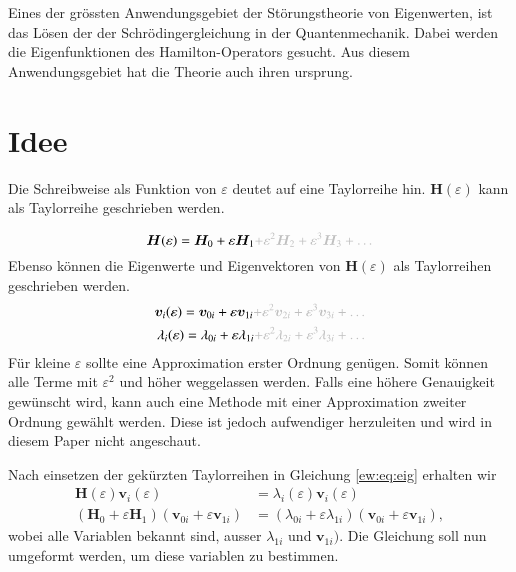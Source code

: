 Eines der grössten Anwendungsgebiet der Störungstheorie von Eigenwerten, ist das Lösen der der Schrödingergleichung in der Quantenmechanik.
Dabei werden die Eigenfunktionen des Hamilton-Operators gesucht.
Aus diesem Anwendungsgebiet hat die Theorie auch ihren ursprung. %

\section{Idee}

Die Schreibweise als Funktion von $\varepsilon$ deutet auf eine Taylorreihe hin. 
$\bm H(\varepsilon)$ kann als Taylorreihe geschrieben werden.

\begin{equation*}
    \bm H(\varepsilon) = \bm H_0 + \varepsilon \bm H_1 \GR{ + \varepsilon^2 \bm H_2  + \varepsilon^3 \bm H_3 + \dots}
\end{equation*}
Ebenso können die Eigenwerte und Eigenvektoren von $\bm H(\varepsilon)$ als Taylorreihen geschrieben werden.
\begin{align}
    \bm v_i(\varepsilon) = \bm v_{0i} + \varepsilon \bm v_{1i} \GR{ + \varepsilon^2 \bm v_{2i}  + \varepsilon^3 \bm v_{3i} + \dots} \label{ew:eq:eigvec} \\
    \lambda_i(\varepsilon) = \lambda_{0i} + \varepsilon \lambda_{1i} \GR{ + \varepsilon^2 \lambda_{2i}  + \varepsilon^3 \lambda_{3i} + \dots}  \label{ew:eq:eigval}
\end{align}
Für kleine $\varepsilon$ sollte eine Approximation erster Ordnung genügen.
Somit können alle Terme mit $\varepsilon^2$ und höher weggelassen werden.
Falls eine höhere Genauigkeit gewünscht wird, kann auch eine Methode mit einer Approximation zweiter Ordnung gewählt werden.
Diese ist jedoch aufwendiger herzuleiten und wird in diesem Paper nicht angeschaut.

Nach einsetzen der gekürzten Taylorreihen in Gleichung \ref{ew:eq:eig} erhalten wir 
\begin{align}
    \bm H(\varepsilon) \bm v_i(\varepsilon)
    &=
    \lambda_i(\varepsilon) \bm v_i(\varepsilon) \\
    (\bm H_0 + \varepsilon \bm H_1)
    (\bm v_{0i} + \varepsilon \bm v_{1i})
    &=
    (\lambda_{0i} + \varepsilon \lambda_{1i})
    (\bm v_{0i} + \varepsilon \bm v_{1i}),
\end{align}
wobei alle Variablen bekannt sind, ausser $\lambda_{1i}$ und $\bm v_{1i})$.
Die Gleichung soll nun umgeformt werden, um diese variablen zu bestimmen.

